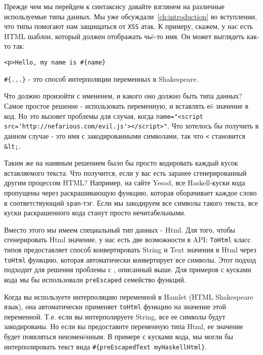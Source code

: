 Прежде чем мы перейдем к синтаксису давайте взглянем на различные используемые 
типы данных. Мы уже обсуждали~\ref{ch:introduction} во вступлении, что типы 
помогают нам защищаться от \texttt{XSS} атак. К примеру, скажем, 
у нас есть HTML шаблон, который должен отображать чьë-то имя. Он может выглядеть
как-то так:

\begin{lstlisting}
<p>Hello, my name is #{name}
\end{lstlisting}


\lstinline!#{...}! - это способ интерполяции переменных в Shakespeare.

Что должно произойти с имененем, и какого оно должно быть типа данных?
Самое простое решение - использовать  переменную, и вставлять 
еë значение в код.  
Но это вызовет проблемы для случая, когда
\lstinline!name="<script src='http://nefarious.com/evil.js'></script>"!.
Что хотелось бы получить в данном случае - это имя с закодированными символами, 
так что 
\lstinline!<! становится \lstinline!&lt;!.

Таким же на наивным решением было бы просто кодировать каждый кусок 
вставляемого текста. Что получится, если у вас есть заранее сгенерированный 
другим процессом HTML? Например, на сайте Yesod, все Haskell-куски кода 
пропущены через раскрашивающую функцию, которая оборачивает каждое слово
в соответствующий \texttt{span}-тэг. Если мы закодируем все символы такого 
текста, все куски раскрашенного кода станут просто нечитабельными.

Вместо этого мы имеем специальный тип данных - Html. Для того, чтобы сгенерировать
Html значение, у нас есть две возможности в API: \lstinline!ToHtml! класс типов
предоставляет способ конвертировать String и Text значения в Html через 
\lstinline!toHtml! функцию, которая автоматически конвертирует все символы.
Этот подход подходит для решения проблемы с , описанный выше. Для
примеров с кусками кода мы бы использовали \lstinline!preEscaped! 
семейство функций.

Когда вы используете интерполяцию переменной в Hamlet (HTML Shakespeare язык), 
она автоматически применяет \lstinline!toHtml! функцию на значение 
этой переменной. Т.е. если вы интерполируете String, все ее символы 
будут закодированы. Но если вы предоставите переменную типа Html, ее значение
будет появляться неизменëнным. В примере с кусками кода, мы могли бы 
интерполировать текст вида \lstinline!#{preEscapedText myHaskellHtml}!.






